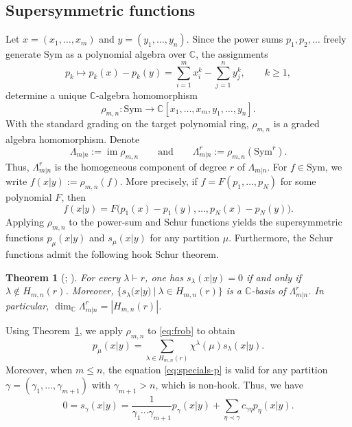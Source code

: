 \documentclass[11pt]{amsart}
\numberwithin{equation}{section}
\theoremstyle{plain}
\newtheorem{thm}{Theorem}[section]
\theoremstyle{definition}
\theoremstyle{remark}
\begin{document}
\subsection{Supersymmetric functions}
Let $x=(x_1,\ldots,x_m)$ and $y=(y_1,\ldots,y_n)$. Since the power sums $p_1,p_2,\ldots$ freely generate $\mathrm{Sym}$ as a polynomial algebra over $\mathbb C$, the assignments
$$
p_k\mapsto p_k(x)-p_k(y)
=
\sum_{i=1}^{m}x_i^k-\sum_{j=1}^{n}y_j^k,
\qquad k\geq1,
$$
determine a unique $\mathbb C$-algebra homomorphism
$$
\rho_{m,n}\colon
\mathrm{Sym}\longrightarrow
\mathbb C[x_1,\ldots,x_m,y_1,\ldots,y_n].
$$
With the standard grading on the target polynomial ring,
$\rho_{m,n}$ is a graded algebra homomorphism. Denote
$$
\Lambda_{m|n}:=\operatorname{im}\rho_{m,n}
\qquad \text{and} \qquad
\Lambda_{m|n}^r:=\rho_{m,n}(\mathrm{Sym}^r).
$$
Thus, $\Lambda_{m|n}^r$ is the homogeneous component of degree $r$
of $\Lambda_{m|n}$.
For $f\in\mathrm{Sym}$, we write $f(x|y):=\rho_{m,n}(f)$. More precisely, if $f=F(p_1,\ldots,p_N)$ for some polynomial $F$, then
$$
f(x|y)
=
F\bigl(
p_1(x)-p_1(y),\ldots,
p_N(x)-p_N(y)
\bigr).
$$
Applying $\rho_{m,n}$ to the power-sum and Schur functions yields the supersymmetric functions $p_\mu(x|y)$ and $s_\mu(x|y)$ for any partition $\mu$. Furthermore, the Schur functions admit the following hook Schur theorem.

\begin{thm}[{\cite[Lemma~6.4 and Corollary~6.5]{BR87};
\cite[Chapter~I, \S3, Example~24(b),(c)]{Mac95}}]\label{thm:hook-schur}
For every $\lambda\vdash r$, one has
$s_\lambda(x|y)=0$ if and only if
$\lambda\notin H_{m,n}(r)$. Moreover,
$\{s_\lambda(x|y)~|~\lambda\in H_{m,n}(r)\}$ is a
$\mathbb C$-basis of $\Lambda_{m|n}^r$. In particular,
$\dim_{\mathbb C}\Lambda_{m|n}^r=|H_{m,n}(r)|$.
\end{thm}

Using Theorem~\ref{thm:hook-schur}, we apply $\rho_{m,n}$ to \eqref{eq:frob}
to obtain
\begin{equation}\label{eq:super-frob}
p_\mu(x|y)
=\sum_{\lambda\in H_{m,n}(r)}
  \chi^\lambda(\mu)s_\lambda(x|y).
\end{equation}
Moreover, when $m\leq n$, the equation \eqref{eq:specials-p} is valid for any partition $\gamma=(\gamma_1,\ldots,\gamma_{m+1})$ with $\gamma_{m+1}>n$, which is non-hook. Thus, we have 
\begin{equation}\label{eq:0=s=p}
0=s_\gamma(x|y)
=
\frac{1}{\gamma_1\cdots\gamma_{m+1}}p_\gamma(x|y)
+
\sum_{\eta\prec\gamma}
c_{\gamma\eta}p_\eta(x|y).
\end{equation}
\end{document}
